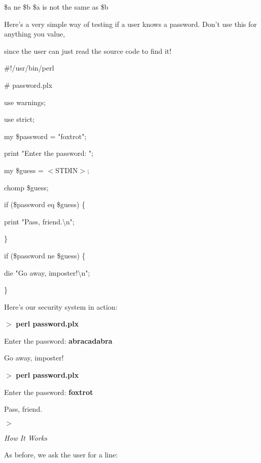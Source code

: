 \documentclass[a4paper,11pt]{book}
\begin{document}
\noindent 

\noindent \$a ne \$b \$a is not the same as \$b

\noindent 

\noindent 

\noindent Here's a very simple way of testing if a user knows a password. Don't use this for anything you value,

\noindent since the user can just read the source code to find it!

\noindent 

\noindent 

\noindent \#!/usr/bin/perl

\noindent \# password.plx

\noindent use warnings;

\noindent use strict;

\noindent 

\noindent my \$password = "foxtrot";

\noindent print "Enter the password: ";

\noindent my \$guess = $<$STDIN$>$;

\noindent chomp \$guess;

\noindent if (\$password eq \$guess) \{

\noindent print "Pass, friend.\textbackslash n";

\noindent \}

\noindent if (\$password ne \$guess) \{

\noindent die "Go away, imposter!\textbackslash n";

\noindent \}

\noindent 

\noindent Here's our security system in action:

\noindent 

\noindent $>$ \textbf{perl password.plx}

\noindent Enter the password: \textbf{abracadabra}

\noindent Go away, imposter!

\noindent $>$ \textbf{perl password.plx}

\noindent Enter the password: \textbf{foxtrot}

\noindent Pass, friend.

\noindent $>$

\noindent 

\noindent \textit{How It Works}

\noindent As before, we ask the user for a line:
\end{document}
